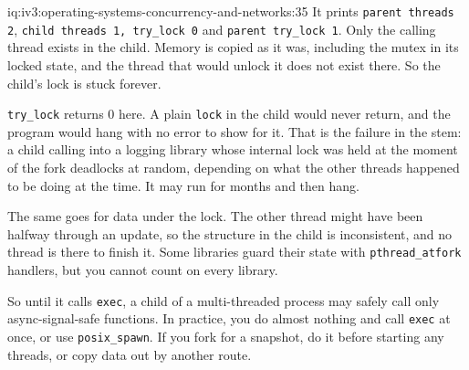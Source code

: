 \begin{solution}{iq:iv3:operating-systems-concurrency-and-networks:35}
It prints \texttt{parent threads 2}, \texttt{child threads 1, try\_lock 0} and \texttt{parent try\_lock 1}. Only the calling thread exists in the child. Memory is copied as it was, including the mutex in its locked state, and the thread that would unlock it does not exist there. So the child's lock is stuck forever.

\texttt{try\_lock} returns 0 here. A plain \texttt{lock} in the child would never return, and the program would hang with no error to show for it. That is the failure in the stem: a child calling into a logging library whose internal lock was held at the moment of the fork deadlocks at random, depending on what the other threads happened to be doing at the time. It may run for months and then hang.

The same goes for data under the lock. The other thread might have been halfway through an update, so the structure in the child is inconsistent, and no thread is there to finish it. Some libraries guard their state with \texttt{pthread\_atfork} handlers, but you cannot count on every library.

So until it calls \texttt{exec}, a child of a multi-threaded process may safely call only async-signal-safe functions. In practice, you do almost nothing and call \texttt{exec} at once, or use \texttt{posix\_spawn}. If you fork for a snapshot, do it before starting any threads, or copy data out by another route.

\end{solution}


